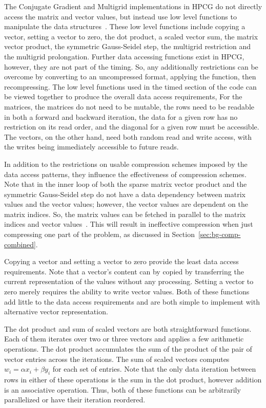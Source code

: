 The Conjugate Gradient and Multigrid implementations in HPCG do not directly access the matrix and vector values, but instead use low level functions to manipulate the data structures~\cite{Dongarra:2015:HPCG}.
These low level functions include copying a vector, setting a vector to zero, the dot product, a scaled vector sum, the matrix vector product, the symmetric Gauss-Seidel step, the multigrid restriction and the multigrid prolongation.
Further data accessing functions exist in HPCG, however, they are not part of the timing.
So, any additionally restrictions can be overcome by converting to an uncompressed format, applying the function, then recompressing.
The low level functions used in the timed section of the code can be viewed together to produce the overall data access requirements,
For the matrices, the matrices do not need to be mutable, the rows need to be readable in both a forward and backward iteration, the data for a given row has no restriction on its read order, and the diagonal for a given row must be accessible.
The vectors, on the other hand, need both random read and write access, with the writes being immediately accessible to future reads.

In addition to the restrictions on usable compression schemes imposed by the data access patterns, they influence the effectiveness of compression schemes.
Note that in the inner loop of both the sparse matrix vector product and the symmetric Gauss-Seidel step do not have a data dependency between matrix values and the vector values; however, the vector values are dependent on the matrix indices.
So, the matrix values can be fetched in parallel to the matrix indices and vector values~\cite{Hennessy:1990:ComputerArchitecture}.
This will result in ineffective compression when just compressing one part of the problem, as discussed in Section~\ref{sec:bg-comp-combined}.

Copying a vector and setting a vector to zero provide the least data access requirements.
Note that a vector's content can by copied by transferring the current representation of the values without any processing.
Setting a vector to zero merely requires the ability to write vector values.
Both of these functions add little to the data access requirements and are both simple to implement with alternative vector representation.

The dot product and sum of scaled vectors are both straightforward functions.
Each of them iterates over two or three vectors and applies a few arithmetic operations.
The dot product accumulates the sum of the product of the pair of vector entries across the iterations.
The sum of scaled vectors computes \(w_i = \alpha x_i + \beta y_i\) for each set of entries.
Note that the only data iteration between rows in either of these operations is the sum in the dot product, however addition is an associative operation.
Thus, both of these functions can be arbitrarily parallelized or have their iteration reordered.


